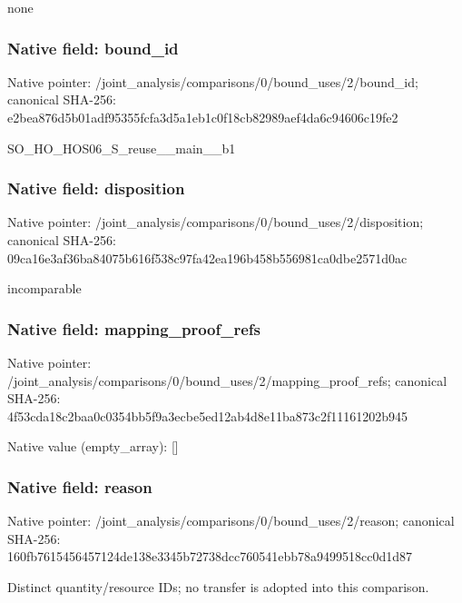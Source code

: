 \documentclass[10pt,a4paper]{article}
\begin{document}
\begingroup\raggedright\sloppy none\par\endgroup

\subsubsection{Native field: bound\_\allowbreak{}id}
Native pointer: /joint\_\allowbreak{}analysis/comparisons/0/bound\_\allowbreak{}uses/2/bound\_\allowbreak{}id; canonical SHA-256: e2bea876d5b01adf95355fcfa3d5a1eb1c0f18cb82989aef4da6c94606c19fe2

\begingroup\raggedright\sloppy SO\_\allowbreak{}HO\_\allowbreak{}HOS06\_\allowbreak{}S\_\allowbreak{}reuse\_\allowbreak{}\_\allowbreak{}main\_\allowbreak{}\_\allowbreak{}b1\par\endgroup

\subsubsection{Native field: disposition}
Native pointer: /joint\_\allowbreak{}analysis/comparisons/0/bound\_\allowbreak{}uses/2/disposition; canonical SHA-256: 09ca16e3af36ba84075b616f538c97fa42ea196b458b556981ca0dbe2571d0ac

\begingroup\raggedright\sloppy incomparable\par\endgroup

\subsubsection{Native field: mapping\_\allowbreak{}proof\_\allowbreak{}refs}
Native pointer: /joint\_\allowbreak{}analysis/comparisons/0/bound\_\allowbreak{}uses/2/mapping\_\allowbreak{}proof\_\allowbreak{}refs; canonical SHA-256: 4f53cda18c2baa0c0354bb5f9a3ecbe5ed12ab4d8e11ba873c2f11161202b945

Native value (empty\_\allowbreak{}array): []

\subsubsection{Native field: reason}
Native pointer: /joint\_\allowbreak{}analysis/comparisons/0/bound\_\allowbreak{}uses/2/reason; canonical SHA-256: 160fb7615456457124de138e3345b72738dcc760541ebb78a9499518cc0d1d87

\begingroup\raggedright\sloppy Distinct quantity/\allowbreak{}resource IDs;\allowbreak{} no transfer is adopted into this comparison.\par\endgroup
\end{document}
